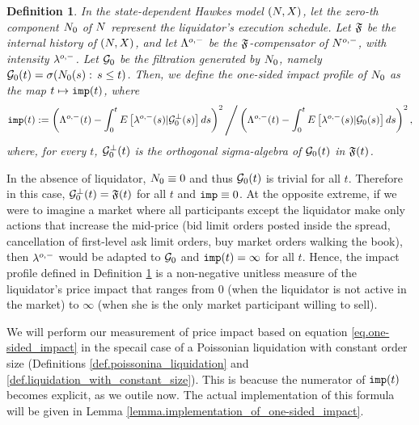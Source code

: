 \documentclass[10pt, article,table]{article}
\newtheorem{defi}[thm]{Definition}
\begin{document}
\begin{defi}\label{def.one-sided_impact}
 In the state-dependent Hawkes model $\sdHawkesPair$, let the zero-th component $\countingProc[0]$ of $\multiCountingProc$ represent the liquidator's execution schedule. Let $\internalHistory$ be the internal history of $\sdHawkesPair$, and let $\weakDeflCompensator$ be the $\internalHistory$-compensator of $\weakDeflPP$, with intensity $\weakDeflIntensity$. Let $\liquidatorSigmaAlgebra$ be the filtration generated by $\countingProc[0]$, namely $\liquidatorSigmaAlgebra(t) = \sigma(\countingProc[0](s): \, s\leq t)$. Then, we define the one-sided impact profile of  $\countingProc[0]$ as the map $t\mapsto \impactProfile(t)$, where
 \begin{equation}\label{eq.one-sided_impact}
  \impactProfile(t):=
  \left(\weakDeflCompensator(t) 
    - \intzerot\Expectation\left[\weakDeflIntensity(s)\vert \liquidatorSigmaAlgebra\orthogonal(s)\right]ds \right)\squared
    \Bigg/
      \left(\weakDeflCompensator(t) 
    - \intzerot\Expectation\left[\weakDeflIntensity(s)\vert \liquidatorSigmaAlgebra(s)\right]ds \right)\squared, 
 \end{equation}
 where, for every $t$,  $\liquidatorSigmaAlgebra\orthogonal(t)$ is the orthogonal sigma-algebra of $\liquidatorSigmaAlgebra(t)$ in $\internalHistory(t)$.
\end{defi}

In the absence of liquidator, $\countingProc[0] \equiv 0$ and thus $\sigmaAlgebraG_0(t)$ is trivial for all $t$. Therefore in this case, $\sigmaAlgebraG_{0}\orthogonal(t) = \internalHistory(t)$ for all $t$ and $\impactProfile \equiv 0$. 
At the opposite extreme, if we were to imagine a market where all participants except the liquidator make only actions that increase the mid-price (bid limit orders posted inside the spread, cancellation of first-level ask limit orders, buy market orders walking the book), then $\weakDeflIntensity$ would be adapted to $\sigmaAlgebraG_0$ and $\impactProfile(t)=\infty$ for all $t$. Hence, the impact profile defined in Definition \ref{def.one-sided_impact} is a non-negative unitless measure of the liquidator's price impact that ranges from $0$ (when the liquidator is not active in the market) to $\infty$ (when she is the only market participant willing to sell). 

We will perform our measurement of price impact based on equation \eqref{eq.one-sided_impact} in the specail case of a Poissonian liquidation with constant order size (Definitions \ref{def.poissonina_liquidation} and \ref{def.liquidation_with_constant_size}). This is beacuse the numerator of $\impactProfile(t)$ becomes explicit, as we outile now. The actual implementation of this formula will be given in Lemma \ref{lemma.implementation_of_one-sided_impact}.
\end{document}
